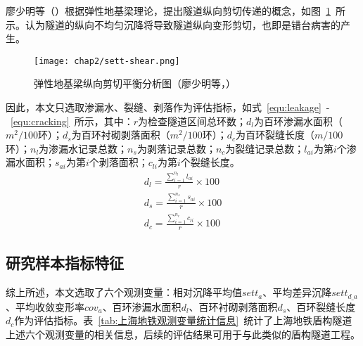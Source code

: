 廖少明等（\citeyear{廖少明2005隧道纵向剪切传递效应及其一维解析}）根据弹性地基梁理论，提出隧道纵向剪切传递的概念，如图~\ref{fig:弹性地基梁纵向剪切平衡分析图}~所示。认为隧道的纵向不均匀沉降将导致隧道纵向变形剪切，也即是错台病害的产生。

\begin{figure}[htbp]
    \centering
    \texttt{[image: chap2/sett-shear.png]}
    \caption{弹性地基梁纵向剪切平衡分析图（廖少明等，\citeyear{廖少明2005隧道纵向剪切传递效应及其一维解析}）}
    \label{fig:弹性地基梁纵向剪切平衡分析图}
\end{figure}

因此，本文只选取渗漏水、裂缝、剥落作为评估指标，如式~\ref{equ:leakage}~-~\ref{equ:cracking}~所示，其中：$r$为检查隧道区间总环数；${d}_{l}$为百环渗漏水面积（$m^2/100$环）；${d}_{s}$为百环衬砌剥落面积（$m^2/100$环）；${d}_{c}$为百环裂缝长度（$m/100$环）；${n}_{l}$为渗漏水记录总数；${n}_{s}$为剥落记录总数；${n}_{c}$为裂缝记录总数；${l}_{ai}$为第$i$个渗漏水面积；${s}_{ai}$为第$i$个剥落面积；${c}_{li}$为第$i$个裂缝长度。
\begin{align}
    \label{equ:leakage}
    {{d}_{l}}=\frac{\sum\limits_{i=1}^{{{n}_{l}}}{{{l}_{ai}}}}{r}\times 100 \\
    \label{equ:spalling}
    {{d}_{s}}=\frac{\sum\limits_{i=1}^{{{n}_{s}}}{{{s}_{ai}}}}{r}\times 100 \\
    \label{equ:cracking}
    {{d}_{c}}=\frac{\sum\limits_{i=1}^{{{n}_{c}}}{{{c}_{li}}}}{r}\times 100
\end{align}
\subsection{研究样本指标特征}

综上所述，本文选取了六个观测变量：相对沉降平均值${sett}_{a}$、平均差异沉降$set{{t}_{d\_a}}$、平均收敛变形率${cov}_{a}$、百环渗漏水面积${d}_{l}$、百环衬砌剥落面积${d}_{s}$、百环裂缝长度${d}_{c}$作为评估指标。表~\ref{tab:上海地铁观测变量统计信息}~统计了上海地铁盾构隧道上述六个观测变量的相关信息，后续的评估结果可用于与此类似的盾构隧道工程。

